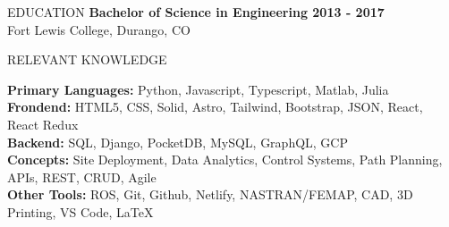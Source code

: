 \documentclass{resume} %
\begin{document}

\begin{newSection}{EDUCATION}
{\bf Bachelor of Science in Engineering \hfill 2013 - 2017}\\
{Fort Lewis College, Durango, CO}
\end{newSection}
\vspace{4mm}

\begin{newSection}{RELEVANT KNOWLEDGE}
\vspace{-4mm}
\begin{multicols}{2}
        {
        {\bf Primary Languages:} Python, Javascript, Typescript, Matlab, Julia \\
         \vspace{1.5mm}
        {\bf Frondend:} HTML5, CSS, Solid, Astro, Tailwind, Bootstrap, JSON,  React, React Redux \\ \vspace{1.5mm}
        {\bf Backend:} SQL, Django, PocketDB, MySQL, GraphQL, GCP \\ \vspace{1.5mm}
        } \vfill\null \columnbreak
        {
        {\bf Concepts:} Site Deployment, Data Analytics, Control Systems, Path Planning, APIs, REST, CRUD, Agile \\ \vspace{1.5mm}
        {\bf Other Tools:} ROS, Git, Github, Netlify, NASTRAN/FEMAP, CAD, 3D Printing, VS Code, LaTeX
        }
    \end{multicols}
\end{newSection}
\vspace{-7mm}
\end{document}
